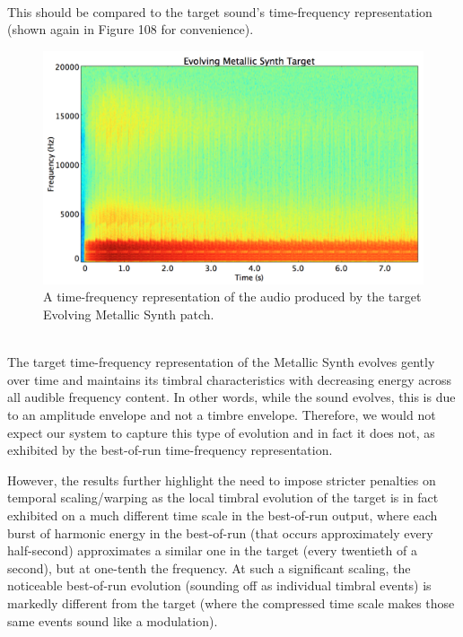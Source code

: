 \documentclass[12pt]{report} 	%
\numberwithin{figure}{chapter}
\numberwithin{table}{chapter}
\numberwithin{equation}{chapter}
\begin{document}
\begin{flushleft}
\begin{figure}[h!]
\begin{center}
\end{center}
\vspace{12pt}
\end{figure}
\\
This should be compared to the target sound's time-frequency representation (shown again in Figure 108 for convenience).
\begin{figure}[h!]
\begin{center}
\includegraphics[scale=0.34]{EvolvingMetallicSynthTargetSTFT}
\caption[Target evolving metallic synth time-frequency representation]{A time-frequency representation of the audio produced by the target Evolving Metallic Synth patch.}
\end{center}
\end{figure}
\\
The target time-frequency representation of the Metallic Synth evolves gently over time and maintains its timbral characteristics with decreasing energy across all audible frequency content. In other words, while the sound evolves, this is due to an amplitude \clearpage
\noindent envelope and not a timbre envelope. Therefore, we would not expect our system to capture this type of evolution and in fact it does not, as exhibited by the best-of-run time-frequency representation.

However, the results further highlight the need to impose stricter penalties on temporal scaling/warping as the local timbral evolution of the target is in fact exhibited on a much different time scale in the best-of-run output, where each burst of harmonic energy in the best-of-run (that occurs approximately every half-second) approximates a similar one in the target (every twentieth of a second), but at one-tenth the frequency. At such a significant scaling, the noticeable best-of-run evolution (sounding off as individual timbral events) is markedly different from the target (where the compressed time scale makes those same events sound like a modulation).


\end{flushleft}
\end{document}

